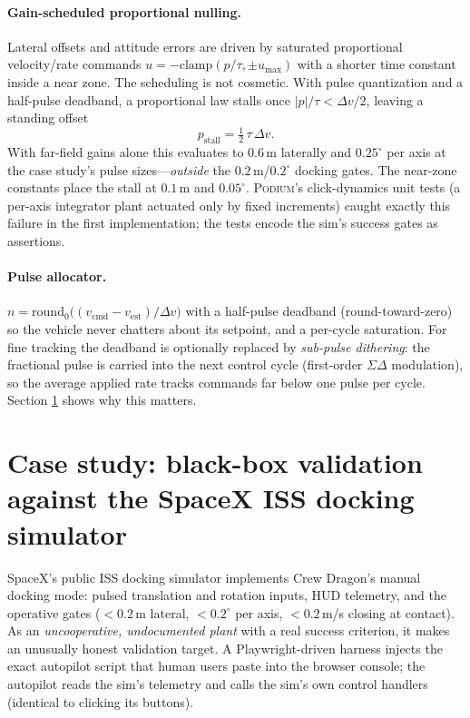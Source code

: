 \documentclass[11pt]{article}
\newcommand{\podium}{\textsc{Podium}}
\begin{document}
\paragraph{Gain-scheduled proportional nulling.} Lateral offsets and
attitude errors are driven by saturated proportional velocity/rate commands
$u = -\mathrm{clamp}(p/\tau,\pm u_{\max})$ with a shorter time constant
inside a near zone. The scheduling is not cosmetic. With pulse quantization
and a half-pulse deadband, a proportional law stalls once
$|p|/\tau < \Delta v/2$, leaving a standing offset
\begin{equation}
p_{\mathrm{stall}} = \tfrac{1}{2}\,\tau\,\Delta v .
\label{eq:stall}
\end{equation}
With far-field gains alone this evaluates to $0.6$\,m laterally and
$0.25^\circ$ per axis at the case study's pulse sizes---\emph{outside} the
$0.2$\,m/$0.2^\circ$ docking gates. The near-zone constants place the stall
at $0.1$\,m and $0.05^\circ$. \podium{}'s click-dynamics unit tests (a
per-axis integrator plant actuated only by fixed increments) caught exactly
this failure in the first implementation; the tests encode the sim's
success gates as assertions.

\paragraph{Pulse allocator.} $n = \mathrm{round}_0\!\bigl((v_{\mathrm{cmd}}
- v_{\mathrm{est}})/\Delta v\bigr)$ with a half-pulse deadband
(round-toward-zero) so the vehicle never chatters about its setpoint, and a
per-cycle saturation. For fine tracking the deadband is optionally replaced
by \emph{sub-pulse dithering}: the fractional pulse is carried into the
next control cycle (first-order $\Sigma\Delta$ modulation), so the average
applied rate tracks commands far below one pulse per cycle. Section
\ref{sec:casestudy} shows why this matters.

\section{Case study: black-box validation against the SpaceX ISS docking
simulator}
\label{sec:casestudy}

SpaceX's public ISS docking simulator \cite{isssim} implements Crew
Dragon's manual docking mode: pulsed translation and rotation inputs, HUD
telemetry, and the operative gates ($<0.2$\,m lateral, $<0.2^\circ$ per
axis, $<0.2$\,m/s closing at contact). As an \emph{uncooperative,
undocumented plant} with a real success criterion, it makes an unusually
honest validation target. A Playwright-driven harness injects the exact
autopilot script that human users paste into the browser console; the
autopilot reads the sim's telemetry and calls the sim's own control
handlers (identical to clicking its buttons).
\end{document}
